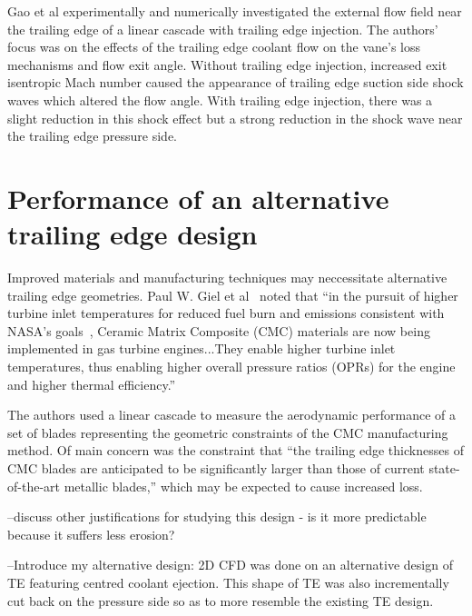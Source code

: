 \documentclass[a4paper, 11pt, twoside]{report}
\begin{document}
Gao et al experimentally and numerically investigated the external flow field near the trailing edge of a linear cascade with trailing edge injection. The authors' focus was on the effects of the trailing edge coolant flow on the vane's loss mechanisms and flow exit angle. Without trailing edge injection, increased exit isentropic Mach number caused the appearance of trailing edge suction side shock waves which altered the flow angle. With trailing edge injection, there was a slight reduction in this shock effect but a strong reduction in the shock wave near the trailing edge pressure side.
		
		
\section{Performance of an alternative trailing edge design}

Improved materials and manufacturing techniques may neccessitate alternative trailing edge geometries. Paul W. Giel et al~\cite{giel_te_thickness} noted that ``in the pursuit of higher turbine inlet temperatures for reduced fuel burn and emissions consistent with NASA's goals~\cite{giel_nasa_reference}, Ceramic Matrix Composite (CMC) materials are now being implemented in gas turbine engines...They enable higher turbine inlet temperatures, thus enabling higher overall pressure ratios (OPRs) for the engine and higher thermal efficiency.'' 

The authors used a linear cascade to measure the aerodynamic performance of a set of blades representing the geometric constraints of the CMC manufacturing method. Of main concern was the constraint that ``the trailing edge thicknesses of CMC blades are anticipated to be significantly larger than those of current state-of-the-art metallic blades,'' which may be expected to cause increased loss. 

--discuss other justifications for studying this design - is it more predictable because it suffers less erosion?

--Introduce my alternative design: 2D CFD was done on an alternative design of TE featuring centred coolant ejection. This shape of TE was also incrementally cut back on the pressure side so as to more resemble the existing TE design.
\end{document}
